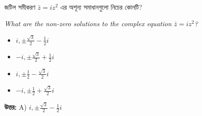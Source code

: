 \documentclass[12pt, a4paper]{article}
\begin{document}
\vspace{1.5em}

\begin{tcolorbox}[questionbox={প্রশ্ন (Question) 12}]
    \noindent
    জটিল সমীকরণ $\bar{z} = i z^2$ এর অশূন্য সমাধানগুলো নিচের কোনটি?
    
    \vspace{0.8em}
    \begin{english}
    \noindent\textit{\color{darkgray}
    What are the non-zero solutions to the complex equation $\bar{z} = i z^2$?
    }
    \end{english}
\end{tcolorbox}

\begin{itemize}[label={}, leftmargin=1cm, itemsep=0.5em]
    \item[\textbf{A)}] $i, \pm \frac{\sqrt{3}}{2} - \frac{1}{2}i$
    \item[\textbf{B)}] $-i, \pm \frac{\sqrt{3}}{2} + \frac{1}{2}i$
    \item[\textbf{C)}] $i, \pm \frac{1}{2} - \frac{\sqrt{3}}{2}i$
    \item[\textbf{D)}] $-i, \pm \frac{1}{2} + \frac{\sqrt{3}}{2}i$
\end{itemize}

\vspace{0.5em}
\begin{tcolorbox}[answerbox]
    \textbf{\color{success} উত্তর:} A) $i, \pm \frac{\sqrt{3}}{2} - \frac{1}{2}i$
\end{tcolorbox}
\vspace{1em}
\end{document}
